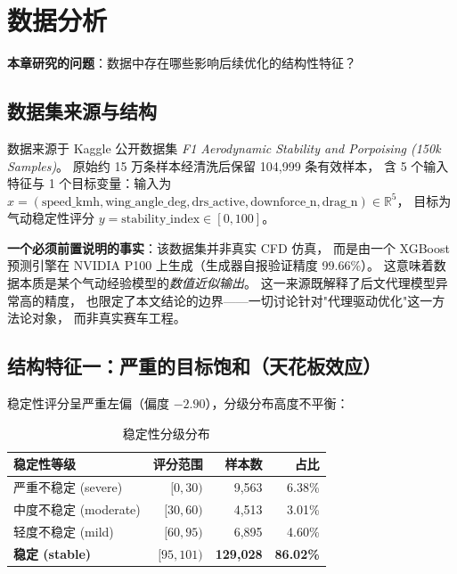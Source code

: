 \section{数据分析}\label{sec:dataset}

\begin{chapterquestion}
\textbf{本章研究的问题}：数据中存在哪些影响后续优化的结构性特征？
\end{chapterquestion}

\subsection{数据集来源与结构}

数据来源于 Kaggle 公开数据集
\emph{F1 Aerodynamic Stability and Porpoising (150k Samples)}。
原始约 15 万条样本经清洗后保留 104{,}999 条有效样本，
含 5 个输入特征与 1 个目标变量：输入为
$x=(\text{speed\_kmh}, \text{wing\_angle\_deg}, \text{drs\_active},
\text{downforce\_n}, \text{drag\_n})\in\mathbb{R}^5$，
目标为气动稳定性评分 $y=\text{stability\_index}\in[0,100]$。

\textbf{一个必须前置说明的事实}：该数据集并非真实 CFD 仿真，
而是由一个 XGBoost 预测引擎在 NVIDIA P100 上生成（生成器自报验证精度 99.66\%）。
这意味着数据本质是某个气动经验模型的\emph{数值近似输出}。
这一来源既解释了后文代理模型异常高的精度，
也限定了本文结论的边界——一切讨论针对"代理驱动优化"这一方法论对象，
而非真实赛车工程。

\subsection{结构特征一：严重的目标饱和（天花板效应）}

稳定性评分呈严重左偏（偏度 $-2.90$），分级分布高度不平衡：

\begin{table}[H]
\centering
\caption{稳定性分级分布}
\begin{tabular}{lrrr}
\toprule
稳定性等级 & 评分范围 & 样本数 & 占比 \\
\midrule
严重不稳定 (severe) & $[0, 30)$ & 9{,}563 & 6.38\% \\
中度不稳定 (moderate) & $[30, 60)$ & 4{,}513 & 3.01\% \\
轻度不稳定 (mild) & $[60, 95)$ & 6{,}895 & 4.60\% \\
\textbf{稳定 (stable)} & $[95, 101)$ & \textbf{129{,}028} & \textbf{86.02\%} \\
\bottomrule
\end{tabular}
\end{table}


